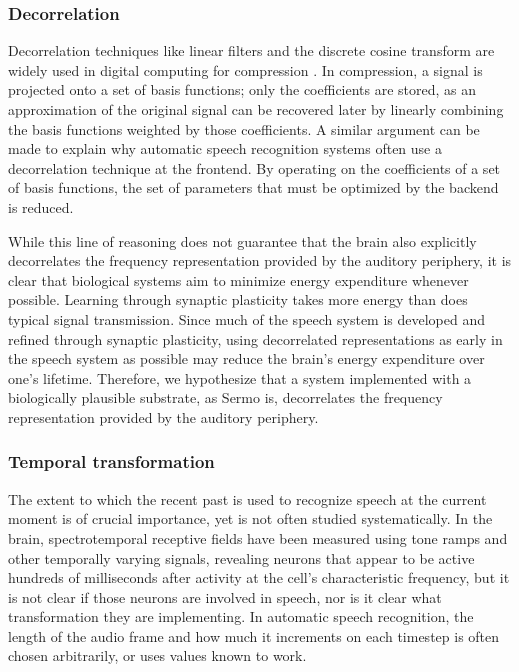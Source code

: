 \subsubsection{Decorrelation}

Decorrelation techniques like
linear filters and the discrete cosine transform
are widely used in digital computing
for compression \citep{khayam2003}.
In compression, a signal is projected
onto a set of basis functions;
only the coefficients are stored,
as an approximation of the original signal
can be recovered later by linearly combining
the basis functions weighted by those coefficients.
A similar argument can be made
to explain why automatic speech recognition systems
often use a decorrelation technique
at the frontend.
By operating on the coefficients of a set
of basis functions,
the set of parameters that must be optimized
by the backend is reduced.

While this line of reasoning
does not guarantee that
the brain also explicitly decorrelates
the frequency representation
provided by the auditory periphery,
it is clear that biological systems
aim to minimize energy expenditure whenever possible.
Learning through synaptic plasticity
takes more energy than does
typical signal transmission.
Since much of the speech system
is developed and refined
through synaptic plasticity,
using decorrelated representations
as early in the speech system as possible
may reduce the brain's energy expenditure
over one's lifetime.
Therefore, we hypothesize
that a system implemented
with a biologically plausible substrate,
as Sermo is,
decorrelates the frequency representation
provided by the auditory periphery.

\subsubsection{Temporal transformation}

The extent to which the recent past
is used to recognize speech
at the current moment
is of crucial importance,
yet is not often studied systematically.
In the brain, spectrotemporal receptive fields
have been measured using
tone ramps and other temporally varying signals,
revealing neurons that appear to be active
hundreds of milliseconds
after activity at
the cell's characteristic frequency,
but it is not clear if those
neurons are involved in speech,
nor is it clear what transformation they are implementing.
In automatic speech recognition,
the length of the audio frame
and how much it increments on each timestep
is often chosen arbitrarily,
or uses values known to work.

